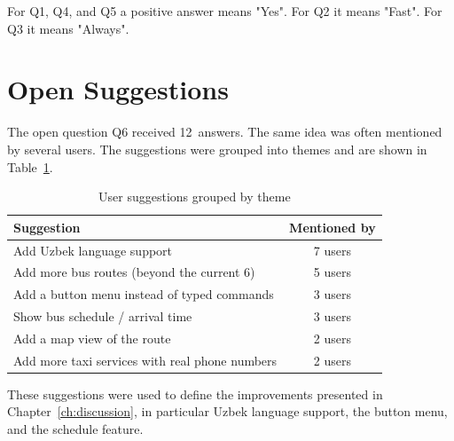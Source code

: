 For Q1, Q4, and Q5 a positive answer means "Yes". For Q2 it means
"Fast". For Q3 it means "Always".

\section{Open Suggestions}
\label{app:open-suggestions}

The open question Q6 received 12~answers. The same idea was often
mentioned by several users. The suggestions were grouped into themes
and are shown in Table~\ref{tab:suggestions}.

\begin{table}[h]
\centering
\caption{User suggestions grouped by theme}
\label{tab:suggestions}
\begin{tabular}{p{}c}
\hline
\textbf{Suggestion} & \textbf{Mentioned by} \\
\hline
Add Uzbek language support & 7 users \\
Add more bus routes (beyond the current 6) & 5 users \\
Add a button menu instead of typed commands & 3 users \\
Show bus schedule / arrival time & 3 users \\
Add a map view of the route & 2 users \\
Add more taxi services with real phone numbers & 2 users \\
\hline
\end{tabular}
\end{table}

These suggestions were used to define the improvements presented in
Chapter~\ref{ch:discussion}, in particular Uzbek language support,
the button menu, and the schedule feature.